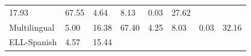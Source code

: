 \documentclass[
]{article}
\begin{document}
\begin{longtable}[]{@{}llllllll@{}}
\begin{minipage}[t]{0.10\columnwidth}
17.93\strut
\end{minipage} & \begin{minipage}[t]{0.10\columnwidth}\raggedright
67.55\strut
\end{minipage} & \begin{minipage}[t]{0.10\columnwidth}\raggedright
4.64\strut
\end{minipage} & \begin{minipage}[t]{0.10\columnwidth}\raggedright
8.13\strut
\end{minipage} & \begin{minipage}[t]{0.10\columnwidth}\raggedright
0.03\strut
\end{minipage} & \begin{minipage}[t]{0.10\columnwidth}\raggedright
27.62\strut
\end{minipage}\tabularnewline
\begin{minipage}[t]{0.10\columnwidth}\raggedright
Multilingual\strut
\end{minipage} & \begin{minipage}[t]{0.10\columnwidth}\raggedright
5.00\strut
\end{minipage} & \begin{minipage}[t]{0.10\columnwidth}\raggedright
16.38\strut
\end{minipage} & \begin{minipage}[t]{0.10\columnwidth}\raggedright
67.40\strut
\end{minipage} & \begin{minipage}[t]{0.10\columnwidth}\raggedright
4.25\strut
\end{minipage} & \begin{minipage}[t]{0.10\columnwidth}\raggedright
8.03\strut
\end{minipage} & \begin{minipage}[t]{0.10\columnwidth}\raggedright
0.03\strut
\end{minipage} & \begin{minipage}[t]{0.10\columnwidth}\raggedright
32.16\strut
\end{minipage}\tabularnewline
\begin{minipage}[t]{0.10\columnwidth}\raggedright
ELL-Spanish\strut
\end{minipage} & \begin{minipage}[t]{0.10\columnwidth}\raggedright
4.57\strut
\end{minipage} & \begin{minipage}[t]{0.10\columnwidth}\raggedright
15.44\strut
\end{minipage} & \begin{minipage}[t]{0.10\columnwidth}\raggedright

\end{minipage}
\end{longtable}
\end{document}
